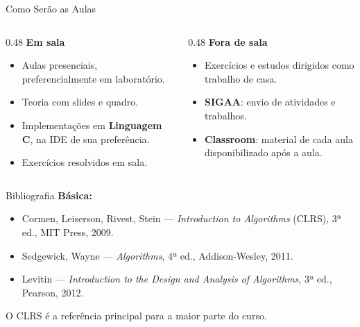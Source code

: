 \documentclass[aspectratio=169]{beamer}
\begin{document}
\begin{frame}{Como Serão as Aulas}
  \begin{columns}[T]
    \begin{column}{0.48\textwidth}
      \textbf{Em sala}
      \begin{itemize}
        \item Aulas presenciais, preferencialmente em laboratório.
        \item Teoria com slides e quadro.
        \item Implementações em \textbf{Linguagem C}, na IDE de sua preferência.
        \item Exercícios resolvidos em sala.
      \end{itemize}
    \end{column}
    \begin{column}{0.48\textwidth}
      \textbf{Fora de sala}
      \begin{itemize}
        \item Exercícios e estudos dirigidos como trabalho de casa.
        \item \textbf{SIGAA}: envio de atividades e trabalhos.
        \item \textbf{Classroom}: material de cada aula disponibilizado após a aula.
      \end{itemize}
    \end{column}
  \end{columns}
\end{frame}

\begin{frame}{Bibliografia}
  \textbf{Básica:}
  \begin{itemize}
    \item Cormen, Leiserson, Rivest, Stein --- \emph{Introduction to Algorithms} (CLRS), 3ª ed., MIT Press, 2009.
    \item Sedgewick, Wayne --- \emph{Algorithms}, 4ª ed., Addison-Wesley, 2011.
    \item Levitin --- \emph{Introduction to the Design and Analysis of Algorithms}, 3ª ed., Pearson, 2012.
  \end{itemize}

  \vspace{0.3cm}
  O CLRS é a referência principal para a maior parte do curso.
\end{frame}
\end{document}

